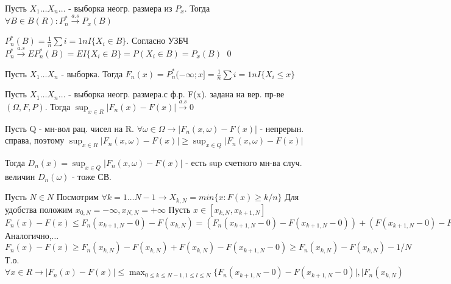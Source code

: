 \documentclass{article}
\begin{document}
	\begin{statement}
		Пусть $X_1 \ldots X_n \ldots$ - выборка неогр. размера из $P_x$.
		Тогда $\forall B \in B(R): P_n^*\xrightarrow{a.s}P_x(B)$
		
		\proof
		$P_n^*(B) = \frac{1}{n} \sum{i=1}{n}I\{X_i \in B\}$.
		Согласно УЗБЧ $P_n^* \xrightarrow{a.s} EP^*_n (B) = EI\{X_i \in B\} = P(X_i \in B) = P_x(B)$
		\qed 
	\end{statement}
	
	\begin{definition}
		Пусть $X_1 \ldots X_n$ - выборка. Тогда 
		$F_n(x) = P_n^*(-\infty; x] = \frac{1}{n}\sum{i=1}{n}I\{X_i \le x\}$
	\end{definition}
	
	\begin{theorem}
		Пусть $X_1 \ldots X_n \ldots$ - выборка неогр. размера.с ф.р. F(x). задана на вер.  пр-ве $(\Omega, F, P)$.
		Тогда $\sup_{x \in R} |F_n(x) - F(x)| \xrightarrow{a.s} 0$
		
		\proof
		Пусть Q - мн-вол рац. чисел на R. $\forall \omega \in\Omega \longrightarrow |F_n(x,\omega)-F(x)|$ - непрерын. справа, поэтому 
		$\sup_{x\in R} |F_n(x,\omega)-F(x)| \ge \sup_{x\in Q} |F_n(x,\omega)-F(x)|$
		
		Тогда $D_n(x) = \sup_{x\in Q} |F_n(x,\omega) - F(x)|$ - есть sup счетного мн-ва случ. величин $D_n(\omega)$ - тоже СВ.
		
		Пусть $N \in N$ Посмотрим $\forall k=1 \ldots N-1 \longrightarrow X_{k,N} = min\{x:F(x) \ge k/n\}$
		Для удобства положим $x_{0,N} = -\infty, x_{N,N} = +\infty$
		Пусть $x \in [x_{k,N},x_{k+1,N}]$
		$F_n(x)-F(x) \le F_n(x_{k+1,N} - 0) - F(x_{k,N}) = (F_n(x_{k+1,N} - 0) - F(x_{k+1,N} - 0)) + (F(x_{k+1,N}-0) - F(x_{k,N}))$
		Аналогично,$\ldots$
		$F_n(x)-F(x) \ge F_n(x_{k,N}) - F(x_{k,N}) + F(x_{k,N}) - F(x_{k+1,N} - 0) \ge F_n(x_{k,N}) - F(x_{k,N}) - 1/N$
		Т.о. $\forall x \in R \longrightarrow |F_n(x) - F(x)| \le \max_{0 \le k \le N-1, 1 \le l \le N}\{F_n(x_{k+1,N} -0) - F(x_{k+1,N} - 0)|, |F_n(x_{k,N})$
	\end{theorem}
	
\end{document}
